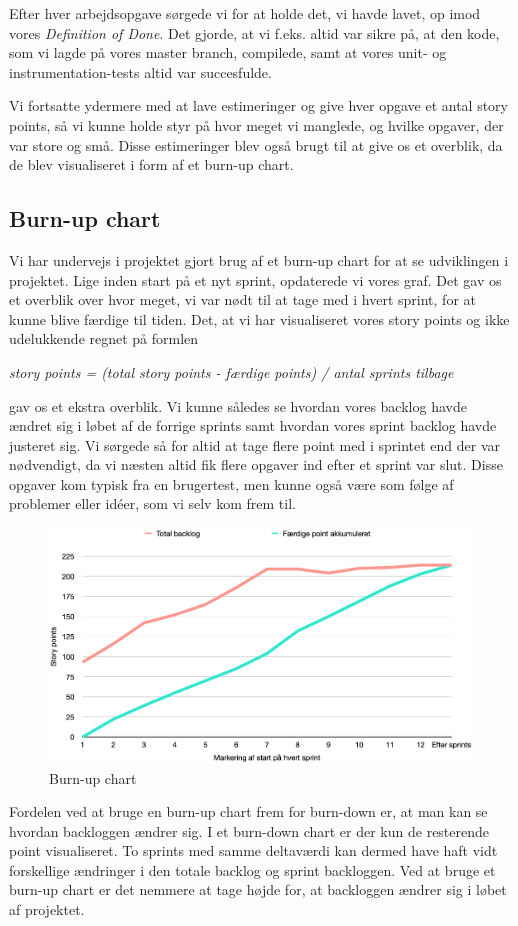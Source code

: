 Efter hver arbejdsopgave sørgede vi for at holde det, vi havde lavet, op imod vores \textit{Definition of Done}. Det gjorde, at vi f.eks. altid var sikre på, at den kode, som vi lagde på vores master branch, compilede, samt at vores unit- og instrumentation-tests altid var succesfulde.

Vi fortsatte ydermere med at lave estimeringer og give hver opgave et antal story points, så vi kunne holde styr på hvor meget vi manglede, og hvilke opgaver, der var store og små. Disse estimeringer blev også brugt til at give os et overblik, da de blev visualiseret i form af et burn-up chart.

\subsection{Burn-up chart}
Vi har undervejs i projektet gjort brug af et burn-up chart for at se udviklingen i projektet. Lige inden start på et nyt sprint, opdaterede vi vores graf. Det gav os et overblik over hvor meget, vi var nødt til at tage med i hvert sprint, for at kunne blive færdige til tiden. Det, at vi har visualiseret vores story points og ikke udelukkende regnet på formlen \medskip

\textit{story points = (total story points - færdige points) / antal sprints tilbage} \smallskip

gav os et ekstra overblik. Vi kunne således se hvordan vores backlog havde ændret sig i løbet af de forrige sprints samt hvordan vores sprint backlog havde justeret sig.  Vi sørgede så for altid at tage flere point med i sprintet end der var nødvendigt, da vi næsten altid fik flere opgaver ind efter et sprint var slut. Disse opgaver kom typisk fra en brugertest, men kunne også være som følge af problemer eller idéer, som vi selv kom frem til.

\begin{figure}[H]
    \centering
    \includegraphics[width=1\textwidth]{img/burn-up-chart.png}
    \caption{Burn-up chart}
\end{figure}

Fordelen ved at bruge en burn-up chart frem for burn-down er, at man kan se hvordan backloggen ændrer sig. I et burn-down chart er der kun de resterende point visualiseret. To sprints med samme deltaværdi kan dermed have haft vidt forskellige ændringer i den totale backlog og sprint backloggen. Ved at bruge et burn-up chart er det nemmere at tage højde for, at backloggen ændrer sig i løbet af projektet.

